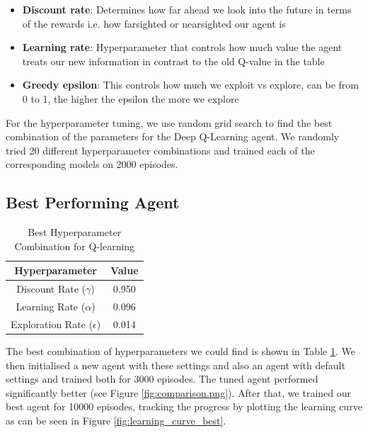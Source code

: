\documentclass[a4paper,12pt]{article}
\begin{document}
\begin{itemize}
    \item \textbf{Discount rate}: Determines how far ahead we look into the future in terms of the rewards i.e. how farsighted or nearsighted our agent is
    \item \textbf{Learning rate}: Hyperparameter that controls how much value the agent treats our new information in contrast to the old Q-value in the table 
    \item \textbf{Greedy epsilon}: This controls how much we exploit vs explore, can be from 0 to 1, the higher the epsilon the more we explore 
\end{itemize}
For the hyperparameter tuning, we use random grid search to find the best combination of the parameters for the Deep Q-Learning agent. We randomly tried 20 different
hyperparameter combinations and trained each of the corresponding models on 2000 episodes.

\subsection{Best Performing Agent}
\begin{table}[h]
    \centering
    \caption{Best Hyperparameter Combination for Q-learning}
    \begin{tabular}{|c|c|}
        \hline
        Hyperparameter & Value \\
        \hline
        Discount Rate (\(\gamma\)) & 0.950 \\
        \hline
        Learning Rate (\(\alpha\)) & 0.096 \\
        \hline
        Exploration Rate (\(\epsilon\)) & 0.014 \\
        \hline
    \end{tabular}
    \label{tab:best_hyperparams}
\end{table}

The best combination of hyperparameters we could find is shown in Table \ref{tab:best_hyperparams}. We then initialised a 
new agent with these settings and also an agent with default settings and trained both for 3000 episodes. The tuned agent 
performed significantly better (see Figure \ref{fig:comparison.png}). After that, we trained our best agent for 10000 episodes, 
tracking the progress by plotting the learning curve as can be seen in Figure \ref{fig:learning_curve_best}.
\end{document}
